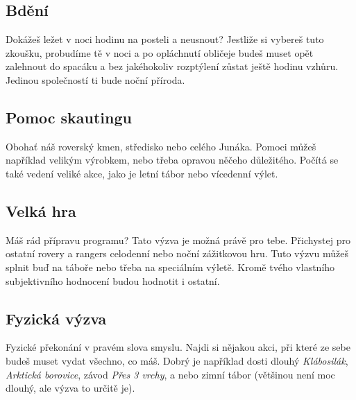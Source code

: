 \documentclass[11pt, fleqn]{article}
\begin{document}
  \subsection*{Bdění}
  Dokážeš ležet v noci hodinu na posteli a neusnout? Jestliže si vybereš tuto zkoušku, probudíme tě v noci a po opláchnutí obličeje budeš muset opět zalehnout do spacáku a bez jakéhokoliv rozptýlení zůstat ještě hodinu vzhůru. Jedinou společností ti bude noční příroda.
  \subsection*{Pomoc skautingu}
  Obohať náš roverský kmen, středisko nebo celého Junáka. Pomoci můžeš například velikým výrobkem, nebo třeba opravou něčeho důležitého. Počítá se také vedení veliké akce, jako je letní tábor nebo vícedenní výlet.
  \subsection*{Velká hra}
  Máš rád přípravu programu? Tato výzva je možná právě pro tebe. Přichystej pro ostatní rovery a rangers celodenní nebo noční zážitkovou hru. Tuto výzvu můžeš splnit buď na táboře nebo třeba na speciálním výletě. Kromě tvého vlastního subjektivního hodnocení budou hodnotit i ostatní.
  \subsection*{Fyzická výzva}
  Fyzické překonání v pravém slova smyslu. Najdi si nějakou akci, při které ze sebe budeš muset vydat všechno, co máš. Dobrý je například dosti dlouhý \textit{Klábosilák}, \textit{Arktická borovice}, závod \textit{Přes 3 vrchy}, a nebo zimní tábor (většinou není moc dlouhý, ale výzva to určitě je).
\end{document}
